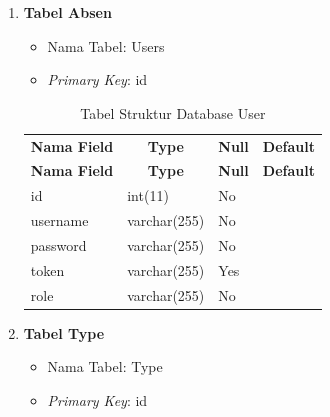 \begin{enumerate}
    \item \textbf{Tabel Absen}
    
    \begin{itemize}
        \item Nama Tabel: Users
        \item \textit{Primary Key}: id
    \end{itemize}

   \begin{longtable}{|p{3cm}|p{3cm}|p{2cm}|p{3cm}|}
	    \captionsetup{position=above} %
	    \caption{Tabel Struktur Database User}
	    \label{tab:struktur-database} \\ \hline
	    \multicolumn{1}{|c|}{\textbf{Nama Field}} & \multicolumn{1}{c|}{\textbf{Type}} & \multicolumn{1}{c|}{\textbf{Null}} & \multicolumn{1}{c|}{\textbf{Default}} \\ \hline
	    \endfirsthead
	    \hline
	    \multicolumn{1}{|c|}{\textbf{Nama Field}} & \multicolumn{1}{c|}{\textbf{Type}} & \multicolumn{1}{c|}{\textbf{Null}} & \multicolumn{1}{c|}{\textbf{Default}} \\ \hline
	    \endhead
	    id & int(11) & No & \\ \hline
	    username & varchar(255) & No & \\ \hline
	    password & varchar(255) & No & \\ \hline
	    token & varchar(255) & Yes & \\ \hline
	    role & varchar(255) & No & \\ \hline
	\end{longtable}


    \item \textbf{Tabel Type}

    \begin{itemize}
        \item Nama Tabel: Type
        \item \textit{Primary Key}: id
    \end{itemize}


\end{enumerate}
